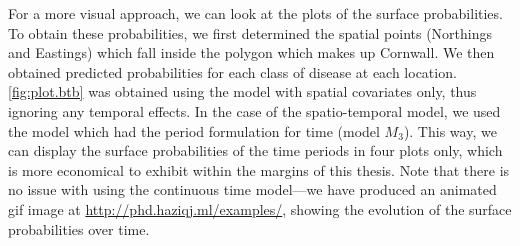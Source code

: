 \documentclass[a4paper,showframe,11pt]{report}\usepackage[]{graphicx}\usepackage[]{color}
\begin{document}
For a more visual approach, we can look at the plots of the surface probabilities.
To obtain these probabilities, we first determined the spatial points (Northings and Eastings) which fall inside the polygon which makes up Cornwall.
We then obtained predicted probabilities for each class of disease at each location.
\cref{fig:plot.btb} was obtained using the model with spatial covariates only, thus ignoring any temporal effects.
In the case of the spatio-temporal model, we used the model which had the period formulation for time (model $M_3$).
This way, we can display the surface probabilities of the time periods in four plots only, which is more economical to exhibit within the margins of this thesis.
Note that there is no issue with using the continuous time model---we have produced an animated gif image at \url{http://phd.haziqj.ml/examples/}, showing the evolution of the surface probabilities over time.
\end{document}

